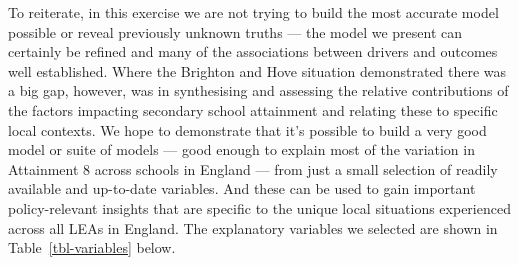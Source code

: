 \documentclass[
  11pt,
]{article}
\begin{document}
To reiterate, in this exercise we are not trying to build the most
accurate model possible or reveal previously unknown truths --- the
model we present can certainly be refined and many of the associations
between drivers and outcomes well established. Where the Brighton and
Hove situation demonstrated there was a big gap, however, was in
synthesising and assessing the relative contributions of the factors
impacting secondary school attainment and relating these to specific
local contexts. We hope to demonstrate that it's possible to build a
very good model or suite of models --- good enough to explain most of
the variation in Attainment 8 across schools in England --- from just a
small selection of readily available and up-to-date variables. And these
can be used to gain important policy-relevant insights that are specific
to the unique local situations experienced across all LEAs in England.
The explanatory variables we selected are shown in
Table~\ref{tbl-variables} below.

\begingroup\fontsize{11}{13}\selectfont
\end{document}
